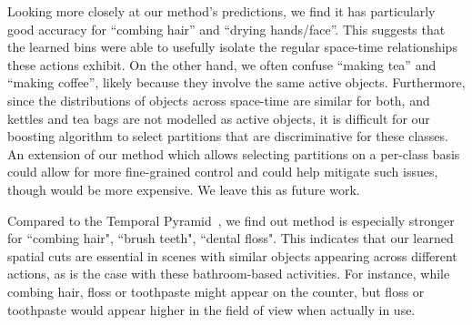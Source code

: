 %
%



Looking more closely at our method's predictions, we find it has particularly good accuracy for ``combing hair'' and ``drying  hands/face''.  This suggests that the learned bins were able to usefully isolate the regular space-time relationships these actions exhibit.  On the other hand, we often confuse ``making tea'' and ``making coffee'', likely because they involve the same active objects.   Furthermore, since the distributions of objects across space-time are similar for both, and kettles and tea bags are not modelled as active objects, it is
  difficult for our boosting algorithm to select partitions that
  are discriminative for these classes. An extension of our method which
  allows selecting partitions on a per-class basis
  could allow for more fine-grained control and could help mitigate such
  issues, though would be more expensive.  We leave this as future work.


Compared to the Temporal Pyramid~\cite{Ramanan12}, we find out method is especially stronger for ``combing hair", ``brush teeth", ``dental floss".  This indicates that our learned spatial cuts are essential in scenes with similar objects appearing across different actions, as is the case with these bathroom-based activities.  For instance, while combing hair, floss or toothpaste might appear on the
counter, but floss or toothpaste would appear higher in the field of view when actually in use.








